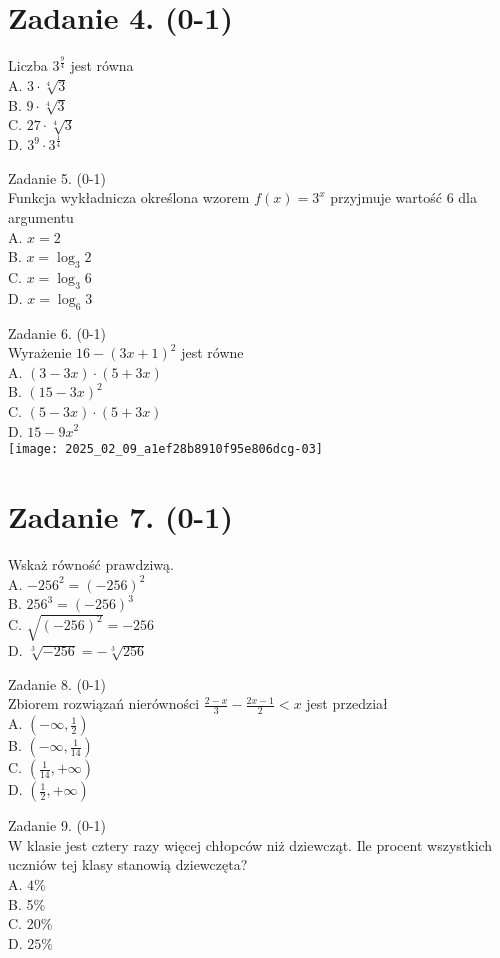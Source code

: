 \documentclass[10pt]{article}
\begin{document}
\section*{Zadanie 4. (0-1)}
Liczba \(3^{\frac{9}{4}}\) jest równa\\
A. \(3 \cdot \sqrt[4]{3}\)\\
B. \(9 \cdot \sqrt[4]{3}\)\\
C. \(27 \cdot \sqrt[4]{3}\)\\
D. \(3^{9} \cdot 3^{\frac{1}{4}}\)

Zadanie 5. (0-1)\\
Funkcja wykładnicza określona wzorem \(f(x)=3^{x}\) przyjmuje wartość 6 dla argumentu\\
A. \(x=2\)\\
B. \(x=\log _{3} 2\)\\
C. \(x=\log _{3} 6\)\\
D. \(x=\log _{6} 3\)

Zadanie 6. (0-1)\\
Wyrażenie \(16-(3 x+1)^{2}\) jest równe\\
A. \((3-3 x) \cdot(5+3 x)\)\\
B. \((15-3 x)^{2}\)\\
C. \((5-3 x) \cdot(5+3 x)\)\\
D. \(15-9 x^{2}\)\\
\texttt{[image: 2025\_02\_09\_a1ef28b8910f95e806dcg-03]}

\section*{Zadanie 7. (0-1)}
Wskaż równość prawdziwą.\\
A. \(-256^{2}=(-256)^{2}\)\\
B. \(256^{3}=(-256)^{3}\)\\
C. \(\sqrt{(-256)^{2}}=-256\)\\
D. \(\sqrt[3]{-256}=-\sqrt[3]{256}\)

Zadanie 8. (0-1)\\
Zbiorem rozwiązań nierówności \(\frac{2-x}{3}-\frac{2 x-1}{2}<x\) jest przedział\\
A. \(\left(-\infty, \frac{1}{2}\right)\)\\
B. \(\left(-\infty, \frac{1}{14}\right)\)\\
C. \(\left(\frac{1}{14},+\infty\right)\)\\
D. \(\left(\frac{1}{2},+\infty\right)\)

Zadanie 9. (0-1)\\
W klasie jest cztery razy więcej chłopców niż dziewcząt. Ile procent wszystkich uczniów tej klasy stanowią dziewczęta?\\
A. \(4 \%\)\\
B. 5\%\\
C. 20\%\\
D. \(25 \%\)
\end{document}
